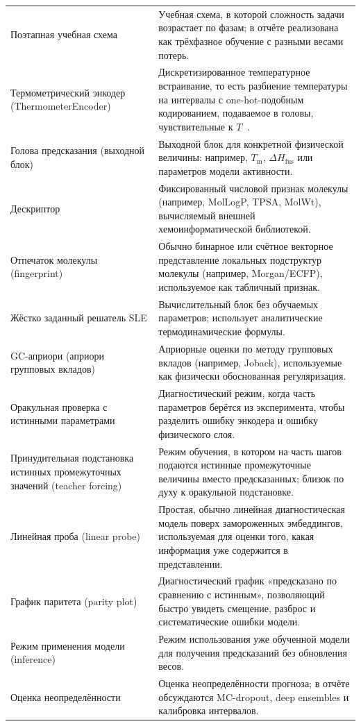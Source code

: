 \documentclass[11pt]{article}
\begin{document}
\begin{longtable}{p{}p{}}
Поэтапная учебная схема & Учебная схема, в которой сложность задачи возрастает по фазам; в отчёте реализована как трёхфазное обучение с разными весами потерь. \\
Термометрический энкодер (ThermometerEncoder) & Дискретизированное температурное встраивание, то есть разбиение температуры на интервалы с one-hot-подобным кодированием, подаваемое в головы, чувствительные к $T$~\cite{buckman2018}. \\
Голова предсказания (выходной блок) & Выходной блок для конкретной физической величины: например, $T_{\mathrm{m}}$, $\Delta H_{\mathrm{fus}}$ или параметров модели активности. \\
Дескриптор & Фиксированный числовой признак молекулы (например, MolLogP, TPSA, MolWt), вычисляемый внешней хемоинформатической библиотекой. \\
Отпечаток молекулы (fingerprint) & Обычно бинарное или счётное векторное представление локальных подструктур молекулы (например, Morgan/ECFP), используемое как табличный признак. \\
Жёстко заданный решатель SLE & Вычислительный блок без обучаемых параметров; использует аналитические термодинамические формулы. \\
GC-априори (априори групповых вкладов) & Априорные оценки по методу групповых вкладов (например, Joback), используемые как физически обоснованная регуляризация. \\
Оракульная проверка с истинными параметрами & Диагностический режим, когда часть параметров берётся из эксперимента, чтобы разделить ошибку энкодера и ошибку физического слоя. \\
Принудительная подстановка истинных промежуточных значений (teacher forcing) & Режим обучения, в котором на часть шагов подаются истинные промежуточные величины вместо предсказанных; близок по духу к оракульной подстановке. \\
Линейная проба (linear probe) & Простая, обычно линейная диагностическая модель поверх замороженных эмбеддингов, используемая для оценки того, какая информация уже содержится в представлении. \\
График паритета (parity plot) & Диагностический график «предсказано по сравнению с истинным», позволяющий быстро увидеть смещение, разброс и систематические ошибки модели. \\
Режим применения модели (inference) & Режим использования уже обученной модели для получения предсказаний без обновления весов. \\
Оценка неопределённости & Оценка неопределённости прогноза; в отчёте обсуждаются MC-dropout, deep ensembles и калибровка интервалов. \\

\end{longtable}
\end{document}
